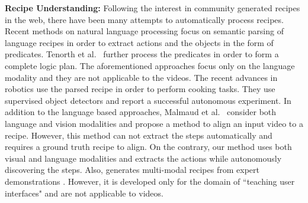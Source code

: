 \noindent\textbf{Recipe Understanding:}
Following the interest in community generated recipes in the web, there have been many attempts to automatically process recipes. Recent methods on natural language processing \cite{cookingSemantics,logicRecipe} focus on semantic parsing of language recipes in order to extract actions and the objects in the form of predicates. Tenorth et al.~\cite{logicRecipe} further process the predicates in order to form a complete logic plan. The aforementioned approaches focus only on the language modality and they are not applicable to the videos. The recent advances \cite{beetz,cookie} in robotics use the parsed recipe in order to perform cooking tasks. They use supervised object detectors and report a successful autonomous experiment. In addition to the language based approaches, Malmaud et al.~\cite{alignment} consider both language and vision modalities and propose a method to align an input video to a recipe. However, this method can not extract the steps automatically and requires a ground truth recipe to align. On the contrary, our method uses both visual and language modalities and extracts the actions while autonomously discovering the steps. Also, \cite{photoshop} generates multi-modal recipes from expert demonstrations . However, it is developed only for the domain of ``teaching user interfaces" and are not applicable to videos.
